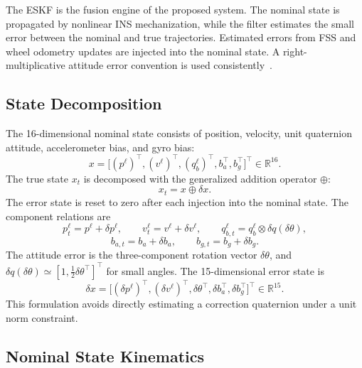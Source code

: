 \documentclass[]{IAC_style}
\begin{document}
The ESKF is the fusion engine of the proposed system. The nominal state is propagated by nonlinear INS mechanization, while the filter estimates the small error between the nominal and true trajectories. Estimated errors from FSS and wheel odometry updates are injected into the nominal state. A right-multiplicative attitude error convention is used consistently~\cite{lefferts1982kalman,sola2017quaternion,sveinsson2012insgps}.

\subsection{State Decomposition}

The 16-dimensional nominal state consists of position, velocity, unit quaternion attitude, accelerometer bias, and gyro bias:
\begin{equation*}
x=\bigl[(p^\ell)^{\top},(v^\ell)^{\top},(q_b^\ell)^{\top},b_a^{\top},b_g^{\top}\bigr]^{\top}\in\mathbb{R}^{16}.
\end{equation*}
The true state $x_t$ is decomposed with the generalized addition operator $\oplus$:
\begin{equation}
\tag{16}\label{eq:16}
x_t=x\oplus\delta x.
\end{equation}
The error state is reset to zero after each injection into the nominal state.
The component relations are
\begin{equation}
\tag{17}\label{eq:17}
p_t^\ell=p^\ell+\delta p^\ell,\qquad v_t^\ell=v^\ell+\delta v^\ell,\qquad q_{b,t}^\ell=q_b^\ell\otimes\delta q(\delta\theta),
\end{equation}
\begin{equation}
\tag{18}\label{eq:18}
b_{a,t}=b_a+\delta b_a,\qquad b_{g,t}=b_g+\delta b_g.
\end{equation}
The attitude error is the three-component rotation vector $\delta\theta$, and $\delta q(\delta\theta)\simeq[1,\tfrac12\delta\theta^\top]^\top$ for small angles. The 15-dimensional error state is
\begin{equation}
\tag{19}\label{eq:19}
\delta x=\bigl[(\delta p^\ell)^{\top},(\delta v^\ell)^{\top},\delta\theta^{\top},\delta b_a^{\top},\delta b_g^{\top}\bigr]^{\top}\in\mathbb{R}^{15}.
\end{equation}
This formulation avoids directly estimating a correction quaternion under a unit norm constraint.

\subsection{Nominal State Kinematics}
\end{document}
